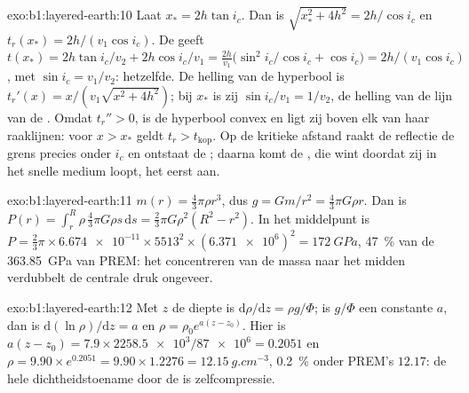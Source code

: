 \begin{solution}{exo:b1:layered-earth:10}
Laat $x_* = 2h\tan i_c$. Dan is $\sqrt{x_*^2 + 4h^2} = 2h/\cos i_c$ en
$t_r(x_*) = 2h/(v_1\cos i_c)$. De  geeft
$t(x_*) = 2h\tan i_c/v_2 + 2h\cos i_c/v_1 = \frac{2h}{v_1}\bigl(\sin^2 i_c/\cos
i_c + \cos i_c\bigr) = 2h/(v_1\cos i_c)$, met $\sin i_c = v_1/v_2$: hetzelfde.
De helling van de hyperbool is $t_r'(x) = x/(v_1\sqrt{x^2 + 4h^2})$; bij $x_*$ is zij
$\sin i_c/v_1 = 1/v_2$, de helling van de lijn van de . Omdat
$t_r'' > 0$, is de hyperbool convex en ligt zij boven elk van haar raaklijnen: voor
$x > x_*$ geldt $t_r > t_{\text{kop}}$. Op de kritieke afstand raakt de reflectie de grens precies onder $i_c$ en ontstaat de ;
daarna komt de , die wint doordat zij in het snelle medium loopt, het eerst aan.
\end{solution}

\begin{solution}{exo:b1:layered-earth:11}
$m(r) = \tfrac43\pi\rho r^3$, dus $g = Gm/r^2 = \tfrac43\pi G\rho r$. Dan is
$P(r) = \int_r^R \rho\,\tfrac43\pi G\rho s\,\mathrm ds = \tfrac23\pi G\rho^2(R^2
- r^2)$. In het middelpunt is $P = \tfrac23\pi\times\num{6.674e-11}\times5513^2\times
(\num{6.371e6})^2 = \qty{172}{GPa}$, \qty{47}{\percent} van de \qty{363.85}{GPa} van PREM: het concentreren van de massa naar het midden verdubbelt de centrale druk ongeveer.
\end{solution}

\begin{solution}{exo:b1:layered-earth:12}
Met $z$ de diepte is $\mathrm d\rho/\mathrm dz = \rho g/\Phi$; is $g/\Phi$ een constante $a$, dan is $\mathrm d(\ln\rho)/\mathrm dz = a$ en $\rho = \rho_0
e^{a(z - z_0)}$. Hier is $a(z - z_0) = 7.9\times\num{2258.5e3}/\num{87e6} =
0.2051$ en $\rho = 9.90\times e^{0.2051} = 9.90\times1.2276 =
\qty{12.15}{g.cm^{-3}}$, \qty{0.2}{\percent} onder PREM's $12.17$: de hele dichtheidstoename door de  is zelfcompressie.
\end{solution}

